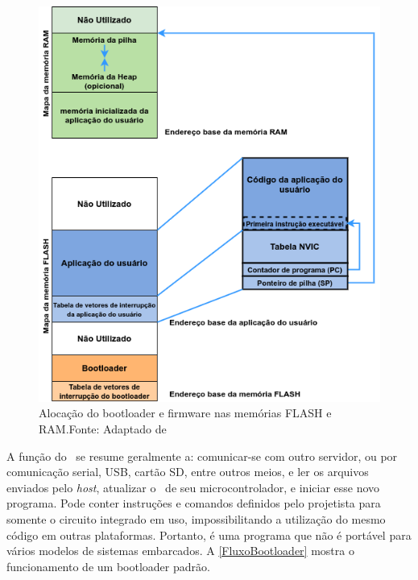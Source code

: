 \begin{figure}[H]
    \scriptsize
     \centering
     \includegraphics[scale=0.7]{dados/figuras/DiagBootloaderOriginal.png}
     \caption{Alocação do bootloader e firmware nas memórias FLASH e RAM.\newline Fonte: Adaptado de \cite{DavesDurlin2013}}
     \label{Diag_Bootloader}
\end{figure}

A função do \bootloader\ se resume geralmente a: comunicar-se com outro servidor, ou por comunicação serial, USB, cartão SD, entre outros meios, e ler os arquivos enviados pelo \textit{host}, atualizar o \firmware\ de seu microcontrolador, e iniciar esse novo programa. 
Pode conter instruções e comandos definidos pelo projetista para somente o circuito integrado em uso, impossibilitando a utilização do mesmo código em outras plataformas.
Portanto, é uma programa que não é portável para vários modelos de sistemas embarcados. A \autoref{FluxoBootloader} mostra o funcionamento de um bootloader padrão. 


